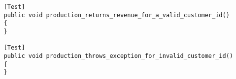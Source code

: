 \begin{verbatim}
    [Test]
    public void production_returns_revenue_for_a_valid_customer_id()
    {
    }
    
    [Test]
    public void production_throws_exception_for_invalid_customer_id()
    {
    }    
\end{verbatim}